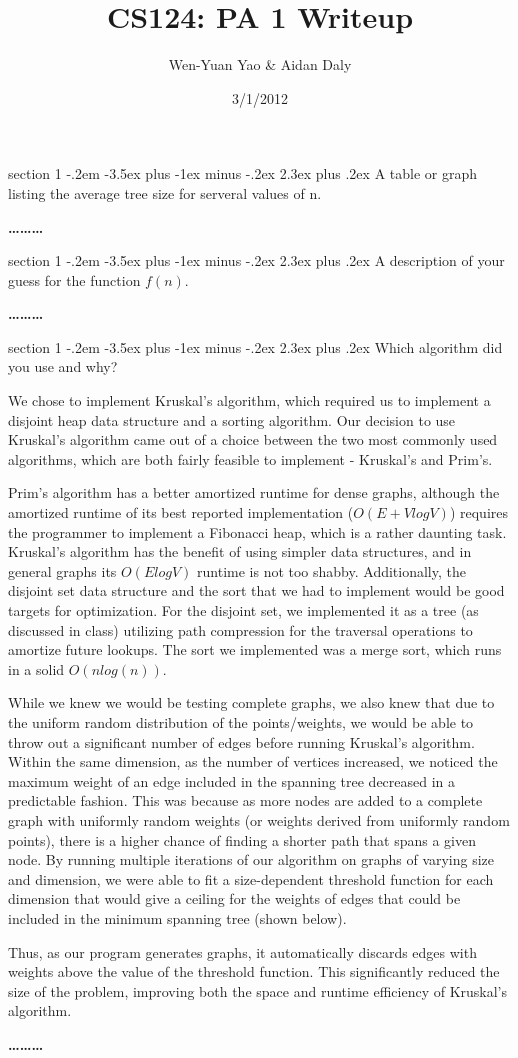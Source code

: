 \documentclass[12pt]{article}
\makeatletter
\newenvironment{problem}{\@startsection
       {section}
       {1}
       {-.2em}
       {-3.5ex plus -1ex minus -.2ex}
       {2.3ex plus .2ex}
       {\pagebreak[3]%
       \large\bf\noindent{Problem }
       }
       }
       {%
       \begin{center}\large\bf \ldots\ldots\ldots\end{center}}
\makeatother
\begin{document}
\title{CS124: PA 1 Writeup}
\author{Wen-Yuan Yao & Aidan Daly}
\date{3/1/2012}
\thispagestyle{empty}

\begin{problem}{}
A table or graph listing the average tree size for serveral values of n.

\end{problem}

\begin{problem}{}
A description of your guess for the function $f(n)$.

\end{problem}

\begin{problem}{}
Which algorithm did you use and why?

We chose to implement Kruskal's algorithm, which required us to implement a disjoint heap data structure and a sorting algorithm.  Our decision to use Kruskal's algorithm came out of a choice between the two most commonly used algorithms, which are both fairly feasible to implement - Kruskal's and Prim's.

Prim's algorithm has a better amortized runtime for dense graphs, although the amortized runtime of its best reported implementation ($O(E + VlogV)$) requires the programmer to implement a Fibonacci heap, which is a rather daunting task.  Kruskal's algorithm has the benefit of using simpler data structures, and in general graphs its $O(ElogV)$ runtime is not too shabby.  Additionally, the disjoint set data structure and the sort that we had to implement would be good targets for optimization.  For the disjoint set, we implemented it as a tree (as discussed in class) utilizing path compression for the traversal operations to amortize future lookups.  The sort we implemented was a merge sort, which runs in a solid $O(nlog(n))$.

While we knew we would be testing complete graphs, we also knew that due to the uniform random distribution of the points/weights, we would be able to throw out a significant number of edges before running Kruskal's algorithm.  Within the same dimension, as the number of vertices increased, we noticed the maximum weight of an edge included in the spanning tree decreased in a predictable fashion.  This was because as more nodes are added to a complete graph with uniformly random weights (or weights derived from uniformly random points), there is a higher chance of finding a shorter path that spans a given node.  By running multiple iterations of our algorithm on graphs of varying size and dimension, we were able to fit a size-dependent threshold function for each dimension that would give a ceiling for the weights of edges that could be included in the minimum spanning tree (shown below).

Thus, as our program generates graphs, it automatically discards edges with weights above the value of the threshold function.  This significantly reduced the size of the problem, improving both the space and runtime efficiency of Kruskal's algorithm.

\end{problem}
\end{document}
